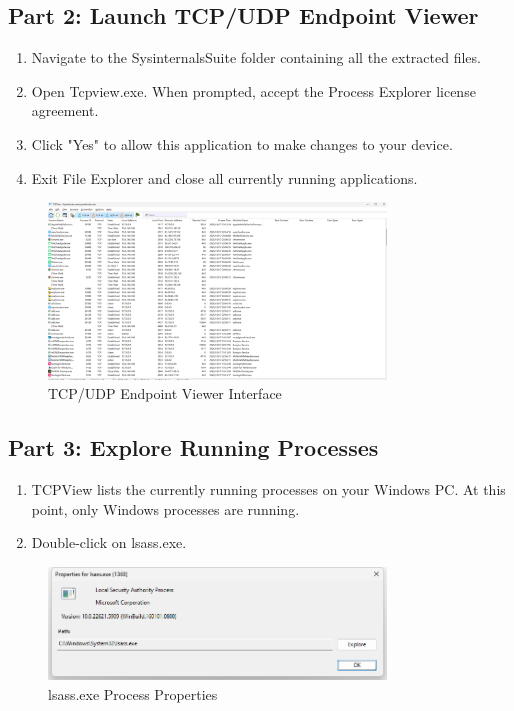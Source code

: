 \documentclass[12pt,a4paper]{article}
\begin{document}
\subsection{Part 2: Launch TCP/UDP Endpoint Viewer}

\begin{enumerate}
    \item Navigate to the SysinternalsSuite folder containing all the extracted files.
    \item Open Tcpview.exe. When prompted, accept the Process Explorer license agreement.
    \item Click "Yes" to allow this application to make changes to your device.
    \item Exit File Explorer and close all currently running applications.
\end{enumerate}

\begin{figure}[H]
    \centering
    \includegraphics[width=0.8\textwidth]{TcpView.png}
    \caption{TCP/UDP Endpoint Viewer Interface}
    \label{fig:tcpview}
\end{figure}

\subsection{Part 3: Explore Running Processes}

\begin{enumerate}
    \item TCPView lists the currently running processes on your Windows PC. At this point, only Windows processes are running.
    \item Double-click on lsass.exe.
\end{enumerate}

\begin{figure}[H]
    \centering
    \includegraphics[width=0.8\textwidth]{lssas.png}
    \caption{lsass.exe Process Properties}
    \label{fig:lsass}
\end{figure}
\end{document}
